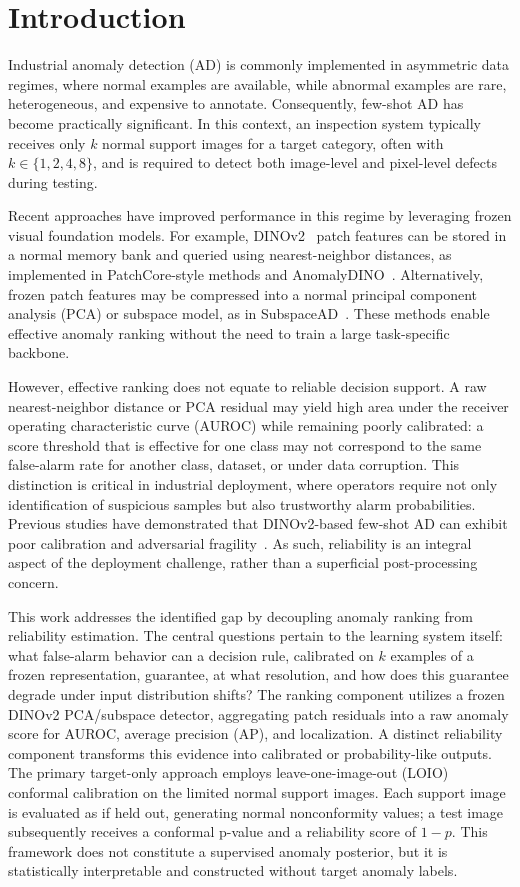 \section{Introduction}\label{sec:introduction}
Industrial anomaly detection (AD) is commonly implemented in asymmetric data regimes, where normal examples are available, while abnormal examples are rare, heterogeneous, and expensive to annotate. Consequently, few-shot AD has become practically significant. In this context, an inspection system typically receives only $k$ normal support images for a target category, often with $k\in\{1,2,4,8\}$, and is required to detect both image-level and pixel-level defects during testing.

Recent approaches have improved performance in this regime by leveraging frozen visual foundation models. For example, DINOv2~\cite{oquab2024dinov2} patch features can be stored in a normal memory bank and queried using nearest-neighbor distances, as implemented in PatchCore-style methods and AnomalyDINO~\cite{roth2022towards,damm2025anomalydino}. Alternatively, frozen patch features may be compressed into a normal principal component analysis (PCA) or subspace model, as in SubspaceAD~\cite{subspacead2026}. These methods enable effective anomaly ranking without the need to train a large task-specific backbone.

However, effective ranking does not equate to reliable decision support. A raw nearest-neighbor distance or PCA residual may yield high area under the receiver operating characteristic curve (AUROC) while remaining poorly calibrated: a score threshold that is effective for one class may not correspond to the same false-alarm rate for another class, dataset, or under data corruption. This distinction is critical in industrial deployment, where operators require not only identification of suspicious samples but also trustworthy alarm probabilities. Previous studies have demonstrated that DINOv2-based few-shot AD can exhibit poor calibration and adversarial fragility~\cite{khan2025calibration}. As such, reliability is an integral aspect of the deployment challenge, rather than a superficial post-processing concern.

This work addresses the identified gap by decoupling anomaly ranking from reliability estimation. The central questions pertain to the learning system itself: what false-alarm behavior can a decision rule, calibrated on $k$ examples of a frozen representation, guarantee, at what resolution, and how does this guarantee degrade under input distribution shifts? The ranking component utilizes a frozen DINOv2 PCA/subspace detector, aggregating patch residuals into a raw anomaly score for AUROC, average precision (AP), and localization. A distinct reliability component transforms this evidence into calibrated or probability-like outputs. The primary target-only approach employs leave-one-image-out (LOIO) conformal calibration on the limited normal support images. Each support image is evaluated as if held out, generating normal nonconformity values; a test image subsequently receives a conformal p-value and a reliability score of $1-p$. This framework does not constitute a supervised anomaly posterior, but it is statistically interpretable and constructed without target anomaly labels.

